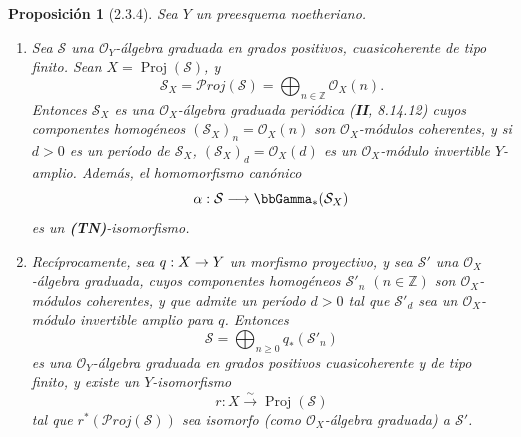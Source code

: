 \documentclass[10pt,oneside,openany]{book}
\theoremstyle{egaenv}\newtheorem*{env}{---}
\theoremstyle{egastatement}
\newtheorem*{proposition}{Proposición}
\theoremstyle{egadescription}
\providecommand{\shProj}{\mathcal{P}\!\mathit{roj}}
\renewcommand{\geq}{\geqslant}
\renewcommand{\to}{\mathchoice{\longrightarrow}{\rightarrow}{\rightarrow}{\rightarrow}}
\begin{document}
\begin{proposition}[2.3.4]
\label{III.2.3.4-fr}
Sea $Y$ un preesquema noetheriano.
\begin{enumerate}
\item[{\rm(i)}] Sea $\mathcal S$ una $\mathcal O_Y$-álgebra graduada en grados positivos, cuasicoherente de tipo finito. Sean $X=\operatorname{Proj}(\mathcal S)$, y
\[
\mathcal S_X=\shProj(\mathcal S)
=\bigoplus_{n\in\mathbb Z}\mathcal O_X(n).
\]
Entonces $\mathcal S_X$ es una $\mathcal O_X$-álgebra graduada periódica \textup{(\textbf{II}, 8.14.12)} cuyos componentes homogéneos $(\mathcal S_X)_n=\mathcal O_X(n)$ son $\mathcal O_X$-módulos coherentes, y si $d>0$ es un período de $\mathcal S_X$, $(\mathcal S_X)_d=\mathcal O_X(d)$ es un $\mathcal O_X$-módulo invertible $Y$-amplio. Además, el homomorfismo canónico
\[
\alpha:\mathcal S\longrightarrow\bbGamma_*(\mathcal S_X)
\]
es un \textup{\textbf{(TN)}}-isomorfismo.
\item[{\rm(ii)}] Recíprocamente, sea $q:X\to Y$ un morfismo proyectivo, y sea $\mathcal S'$ una $\mathcal O_X$-álgebra graduada, cuyos componentes homogéneos $\mathcal S'_n$ $(n\in\mathbb Z)$ son $\mathcal O_X$-módulos coherentes, y que admite un período $d>0$ tal que $\mathcal S'_d$ sea un $\mathcal O_X$-módulo invertible amplio para $q$. Entonces
\[
\mathcal S=\bigoplus_{n\geq0}q_*(\mathcal S'_n)
\]
es una $\mathcal O_Y$-álgebra graduada en grados positivos cuasicoherente y de tipo finito, y existe un $Y$-isomorfismo
\[
r:X\xrightarrow{\sim}\operatorname{Proj}(\mathcal S)
\]
tal que $r^*(\shProj(\mathcal S))$ sea isomorfo (como $\mathcal O_X$-álgebra graduada) a $\mathcal S'$.
\end{enumerate}
\end{proposition}
\end{document}
